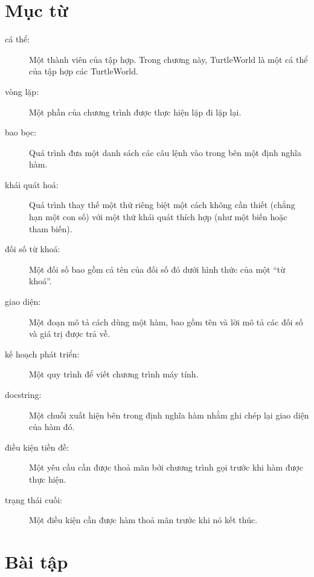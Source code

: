 \documentclass[11pt]{book}
\begin{document}
\section{Mục từ}

\begin{description}

\item[cá thể:] Một thành viên của tập hợp. Trong chương này, TurtleWorld
là một cá thể của tập hợp các TurtleWorld.

\item[vòng lặp:] Một phần của chương trình được thực hiện lặp đi lặp lại.

\item[bao bọc:] Quá trình đưa một danh sách các câu lệnh vào trong bên một
định nghĩa hàm.

\item[khái quát hoá:] Quá trình thay thế một thứ riêng biệt một cách không
cần thiết (chẳng hạn một con số) với một thứ khái quát thích hợp (như
một biến hoặc tham biến).

\item[đối số từ khoá:] Một đối số bao gồm cả tên của đối số đó dưới
hình thức của một ``từ khoá''.

\item[giao diện:] Một đoạn mô tả cách dùng một hàm, bao gồm tên và
lời mô tả các đối số và giá trị được trả về.

\item[kế hoạch phát triển:] Một quy trình để viết chương trình
máy tính.

\item[docstring:]  Một chuỗi xuất hiện bên trong định nghĩa hàm
nhằm ghi chép lại giao diện của hàm đó.

\item[điều kiện tiền đề:] Một yêu cầu cần được thoả mãn bởi chương
trình gọi trước khi hàm được thực hiện.

\item[trạng thái cuối:] Một điều kiện cần được hàm thoả mãn trước khi
nó kết thúc.

\end{description}


\section{Bài tập}
\end{document}
